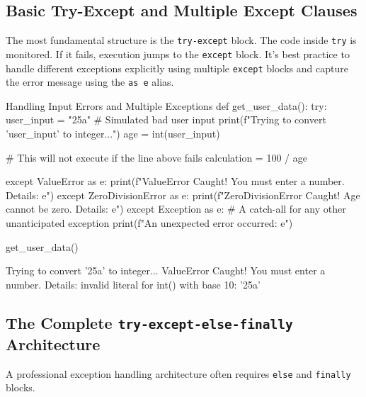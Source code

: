 \subsection{Basic Try-Except and Multiple Except Clauses}

The most fundamental structure is the \texttt{try-except} block. The code inside \texttt{try} is monitored. If it fails, execution jumps to the \texttt{except} block. It's best practice to handle different exceptions explicitly using multiple \texttt{except} blocks and capture the error message using the \texttt{as e} alias.

\begin{pythoncode}{Handling Input Errors and Multiple Exceptions}
def get_user_data():
    try:
        user_input = "25a" # Simulated bad user input
        print(f"Trying to convert '{user_input}' to integer...")
        age = int(user_input)
        
        # This will not execute if the line above fails
        calculation = 100 / age
        
    except ValueError as e:
        print(f"ValueError Caught! You must enter a number. Details: {e}")
    except ZeroDivisionError as e:
        print(f"ZeroDivisionError Caught! Age cannot be zero. Details: {e}")
    except Exception as e:
        # A catch-all for any other unanticipated exception
        print(f"An unexpected error occurred: {e}")

get_user_data()
\end{pythoncode}
\begin{outputbox}
Trying to convert '25a' to integer...
ValueError Caught! You must enter a number. Details: invalid literal for int() with base 10: '25a'
\end{outputbox}

\subsection{The Complete \texttt{try-except-else-finally} Architecture}

A professional exception handling architecture often requires \texttt{else} and \texttt{finally} blocks.

